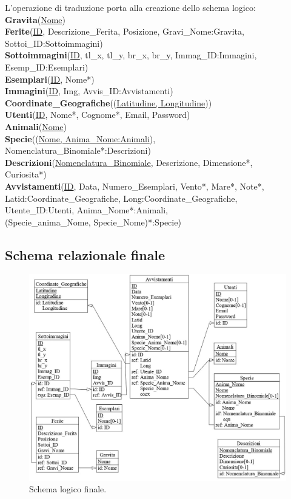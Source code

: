 \documentclass[a4paper,final,12pt]{report}
\newcommand\tab[1][13mm]{\hspace*{#1}}
\begin{document}
L'operazione di traduzione porta alla creazione dello schema logico:\\
\textbf{Gravita}(\underline{Nome})\\
\textbf{Ferite}(\underline{ID}, Descrizione\_Ferita, Posizione, Gravi\_Nome:Gravita, \\ \tab Sottoi\_ID:Sottoimmagini)\\
\textbf{Sottoimmagini}(\underline{ID}, tl\_x, tl\_y, br\_x, br\_y, Immag\_ID:Immagini,\\ \tab Esemp\_ID:Esemplari)\\
\textbf{Esemplari}(\underline{ID}, Nome*)\\
\textbf{Immagini}(\underline{ID}, Img, Avvis\_ID:Avvistamenti)\\
\textbf{Coordinate\_Geografiche}((\underline{Latitudine, Longitudine}))\\
\textbf{Utenti}(\underline{ID}, Nome*, Cognome*, Email, Password)\\
\textbf{Animali}(\underline{Nome})\\
\textbf{Specie}((\underline{Nome, Anima\_Nome:Animali}),\\ \tab Nomenclatura\_Binomiale*:Descrizioni)\\
\textbf{Descrizioni}(\underline{Nomenclatura\_Binomiale}, Descrizione, Dimensione*,\\ \tab Curiosita*)\\
\textbf{Avvistamenti}(\underline{ID}, Data, Numero\_Esemplari, Vento*, Mare*, Note*,\\ \tab Latid:Coordinate\_Geografiche, Long:Coordinate\_Geografiche,\\ \tab Utente\_ID:Utenti, Anima\_Nome*:Animali,\\ \tab (Specie\_anima\_Nome, Specie\_Nome)*:Specie)\\

\newpage
\subsection{Schema relazionale finale}
\begin{figure}[hbtp]
\centering
\includegraphics[scale=0.70]{img_concettuale/Logico.jpg}
\caption{Schema logico finale.}
\end{figure}
\end{document}
